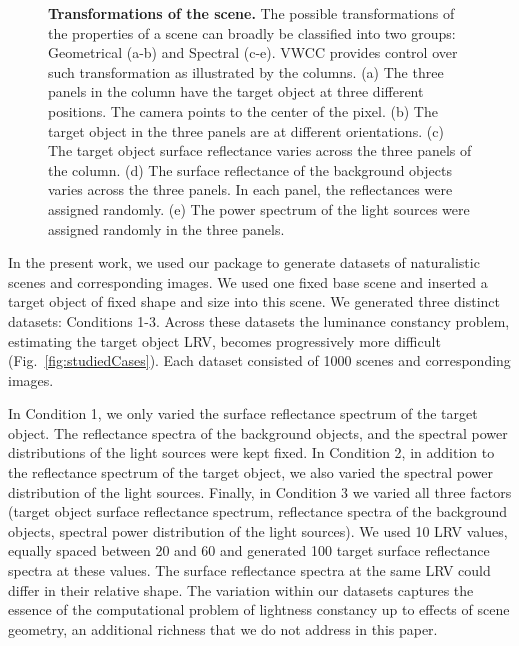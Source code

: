 \documentclass{jov}
\begin{document}
\begin{figure}
\begin{subfigure}[b]{0.18 \textwidth}
        \label{fig:illuminationVariation}
    \end{subfigure}
    \caption{{\bf Transformations of the scene.} The possible transformations of the properties of a scene can broadly be classified into two groups: Geometrical (a-b) and Spectral (c-e). VWCC provides control over such transformation as illustrated by the columns. (a) The three panels in the column have the target object at three different positions. The camera points to the center of the pixel. (b) The target object in the three panels are at different orientations. (c) The target object surface reflectance varies across the three panels of the column. (d) The surface reflectance of the background objects varies across the three panels. In each panel, the reflectances were assigned randomly. (e) The power spectrum of the light sources were assigned randomly in the three panels. 
\label{fig:VWCCTransformations}}
\end{figure}

In the present work, we used our package to generate datasets of naturalistic scenes and corresponding images.
We used one fixed base scene and inserted a target object of fixed shape and size into this scene.
We generated three distinct datasets: Conditions 1-3.
Across these datasets the luminance constancy problem, estimating the target object LRV,
becomes progressively more difficult (Fig.~\ref{fig:studiedCases}).
Each dataset consisted of 1000 scenes and corresponding images.


In Condition 1, we only varied the surface reflectance spectrum of the target object.
The reflectance spectra of the background objects, and the spectral power distributions of the light sources were kept fixed.
In Condition 2, in addition to the reflectance spectrum of the target object,
we also varied the spectral power distribution of the light sources.
Finally, in Condition 3 we varied all three factors (target object surface 
reflectance spectrum, reflectance spectra of the background objects, 
spectral power distribution of the light sources).
We used 10 LRV values, equally spaced between 20 and 60 and generated 100 target surface reflectance spectra at these values. 
The surface reflectance spectra at the same LRV could differ in their relative shape.
The variation within our datasets captures the essence of the computational problem of lightness constancy
up to effects of scene geometry, an additional richness that we do not address in this paper.
\end{document}
